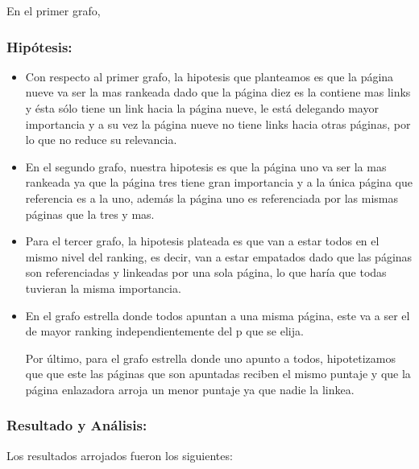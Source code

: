 En el primer grafo, 

\subsubsection{Hipótesis:}

\begin{itemize}
	\item Con respecto al primer grafo, la hipotesis que planteamos es que la página nueve va ser la mas rankeada dado que la página diez es la contiene mas links y ésta sólo tiene un link hacia la página nueve, le está delegando mayor importancia y a su vez la página nueve no tiene links hacia otras páginas, por lo que no reduce su relevancia.
	
\item En el segundo grafo, nuestra hipotesis es que la página uno va ser la mas rankeada ya que la página tres tiene gran importancia y a la única página que referencia es a la uno, además la página uno es referenciada por las mismas páginas que la tres y mas.

\item Para el tercer grafo, la hipotesis plateada es que van a estar todos en el mismo nivel del ranking, es decir, van a estar empatados dado que las páginas son referenciadas y linkeadas por una sola página, lo que haría que todas tuvieran la misma importancia.

\item En el grafo estrella donde todos apuntan a una misma página, este va a ser el de mayor ranking independientemente del p que se elija. 

\Para Por último, para el grafo estrella donde uno apunto a todos, hipotetizamos que que este las páginas que son apuntadas reciben el mismo puntaje y que la página enlazadora arroja un menor puntaje ya que nadie la linkea.  

\end{itemize}

\subsubsection{Resultado y Análisis: }


Los resultados arrojados fueron los siguientes:

